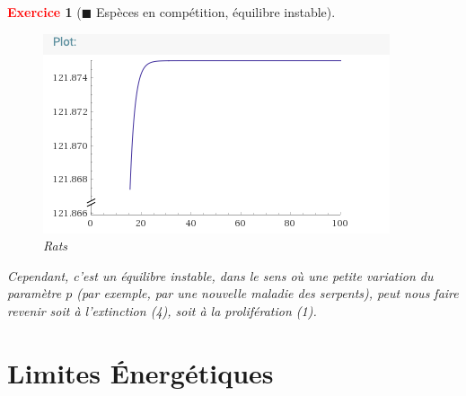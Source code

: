 \documentclass[11pt]{article}
\theoremstyle{mythmstyle}
\newtheorem{exo}{\textcolor{red}{\textbf{Exercice}}}
\begin{document}
\begin{exo}[$\blacksquare$ Espèces en compétition, équilibre instable]
\begin{enumerate}
\begin{enumerate}
\begin{solution}
        \begin{figure}[H]
        \begin{center}
         \includegraphics[scale=0.5]{ratsp0125.png}
        \caption{Rats}
        \end{center}
        \end{figure}
    
    
    Cependant, c'est un équilibre instable, dans le sens où une petite variation du paramètre $p$ (par exemple, par une nouvelle maladie des serpents), peut nous faire revenir soit à l'extinction (4), soit à la prolifération (1). 
\end{solution}
\end{enumerate}
\end{enumerate}
\end{exo}
 
 
\section{Limites Énergétiques}
\end{document}
